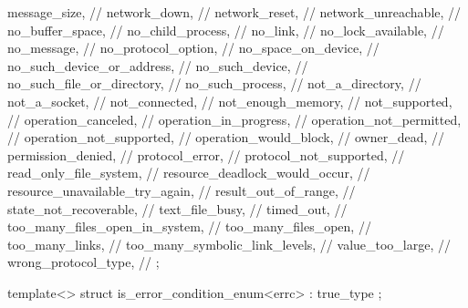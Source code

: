 \begin{codeblock}
{{    message_size,                       // 
    network_down,                       // 
    network_reset,                      // 
    network_unreachable,                // 
    no_buffer_space,                    // 
    no_child_process,                   // 
    no_link,                            // 
    no_lock_available,                  // 
    no_message,                         // 
    no_protocol_option,                 // 
    no_space_on_device,                 // 
    no_such_device_or_address,          // 
    no_such_device,                     // 
    no_such_file_or_directory,          // 
    no_such_process,                    // 
    not_a_directory,                    // 
    not_a_socket,                       // 
    not_connected,                      // 
    not_enough_memory,                  // 
    not_supported,                      // 
    operation_canceled,                 // 
    operation_in_progress,              // 
    operation_not_permitted,            // 
    operation_not_supported,            // 
    operation_would_block,              // 
    owner_dead,                         // 
    permission_denied,                  // 
    protocol_error,                     // 
    protocol_not_supported,             // 
    read_only_file_system,              // 
    resource_deadlock_would_occur,      // 
    resource_unavailable_try_again,     // 
    result_out_of_range,                // 
    state_not_recoverable,              // 
    text_file_busy,                     // 
    timed_out,                          // 
    too_many_files_open_in_system,      // 
    too_many_files_open,                // 
    too_many_links,                     // 
    too_many_symbolic_link_levels,      // 
    value_too_large,                    // 
    wrong_protocol_type,                // 
  };

  template<> struct is_error_condition_enum<errc> : true_type {};

}
\end{codeblock}
